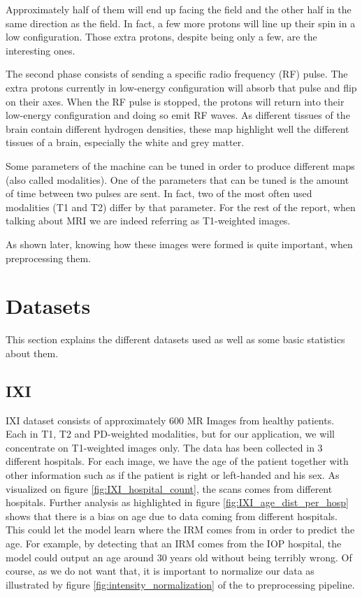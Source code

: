 Approximately half of them will end up facing the field and the other half in the same direction as the field. In fact, a few more protons will line up their spin in a low configuration. Those extra protons, despite being only a few, are the interesting ones.

The second phase consists of sending a specific radio frequency (RF) pulse. The extra protons currently in low-energy configuration will absorb that pulse and flip on their axes.  When the RF pulse is stopped, the protons will return into their low-energy configuration and doing so emit RF waves. As different tissues of the brain contain different hydrogen densities, these map highlight well the different tissues of a brain, especially the white and grey matter.

Some parameters of the machine can be tuned in order to produce different maps (also called modalities). One of the parameters that can be tuned is the amount of time between two pulses are sent. In fact, two of the most often used modalities (T1 and T2) differ by that parameter. For the rest of the report, when talking about MRI we are indeed referring as T1-weighted images.

As shown later, knowing how these images were formed is quite important, when preprocessing them.

\section{Datasets}
This section explains the different datasets used as well as some basic statistics about them.
\subsection{IXI}
IXI dataset consists of approximately 600 MR Images from healthy patients. Each in T1, T2 and PD-weighted modalities, but for our application, we will concentrate on T1-weighted images only. The data has been collected in 3 different hospitals. For each image, we have the age of the patient together with other information such as if the patient is right or left-handed and his sex. As visualized on figure \ref{fig:IXI_hospital_count}, the scans comes from different hospitals. Further analysis as highlighted in figure \ref{fig:IXI_age_dist_per_hosp} shows that there is a bias on age due to data coming from different hospitals. This could let the model learn where the IRM comes from in order to predict the age. For example, by detecting that an IRM comes from the IOP hospital, the model could output an age around 30 years old without being terribly wrong. Of course, as we do not want that, it is important to normalize our data as illustrated by figure \ref{fig:intensity_normalization} of the to preprocessing pipeline.

